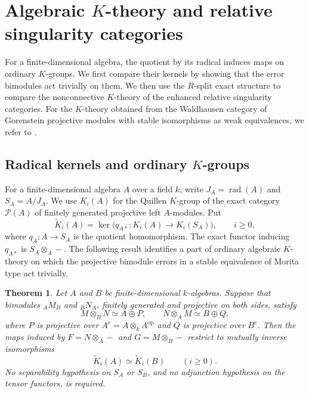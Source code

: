 \documentclass[12pt,a4paper,english,reqno]{amsart}
\numberwithin{equation}{section}
\theoremstyle{plain}
\newtheorem{theorem}{Theorem}[section]
\theoremstyle{definition}
\begin{document}
\section{Algebraic \texorpdfstring{$K$}{K}-theory and relative singularity categories}
\label{sec:k-theory}

For a finite-dimensional algebra, the quotient by its radical
induces maps on ordinary $K$-groups. We first compare their kernels
by showing that the error bimodules act trivially on them. We then
use the $R$-split exact structure to compare the nonconnective
$K$-theory of the enhanced relative singularity categories.
For the $K$-theory obtained from the Waldhausen category of
Gorenstein projective modules with stable isomorphisms as weak
equivalences, we refer to \cite{Ren2022}.

\subsection{Radical kernels and ordinary \texorpdfstring{$K$}{K}-groups}

For a finite-dimensional algebra $A$ over a field $k$, write
$J_A=\operatorname{rad}(A)$ and $S_A=A/J_A$. We use $K_i(A)$ for
the Quillen $K$-group of the exact category $\mathcal P(A)$ of finitely
generated projective left $A$-modules. Put
\[
 \widetilde K_i(A)=
 \ker\bigl(q_{A*}:K_i(A)\longrightarrow K_i(S_A)\bigr),
 \qquad i\geq0,
\]
where $q_A:A\to S_A$ is the quotient homomorphism. The exact functor
inducing $q_{A*}$ is $S_A\otimes_A-$. The following result identifies
a part of ordinary algebraic $K$-theory on which the projective
bimodule errors in a stable equivalence of Morita type act trivially.

\begin{theorem}\label{thm:radical-kernel-invariance}
Let $A$ and $B$ be finite-dimensional $k$-algebras. Suppose that
bimodules ${}_AM_B$ and ${}_BN_A$, finitely generated and projective
on both sides, satisfy
\[
 M\otimes_BN\simeq A\oplus P,
 \qquad
 N\otimes_AM\simeq B\oplus Q,
\]
where $P$ is projective over $A^e=A\otimes_kA^{\mathrm{op}}$ and
$Q$ is projective over $B^e$. Then the maps induced by
$F=N\otimes_A-$ and $G=M\otimes_B-$ restrict to mutually inverse
isomorphisms
\[
 \widetilde K_i(A)\simeq\widetilde K_i(B)
 \qquad(i\geq0).
\]
No separability hypothesis on $S_A$ or $S_B$, and no adjunction
hypothesis on the tensor functors, is required.
\end{theorem}
\end{document}
